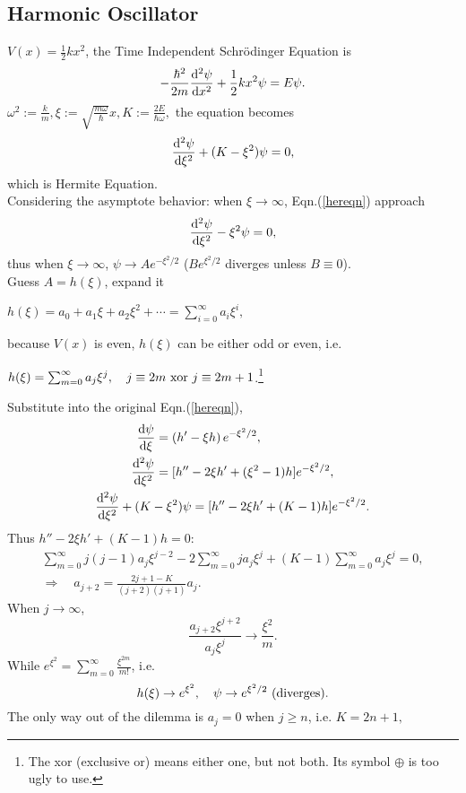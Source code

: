 \documentclass{article}
\def\d{{\rm d}}
\newcommand{\su}[1]{\vspace{-#1 pt}}%
\newcommand{\ds}[2]{\frac{\d #1}{\d #2}}%
\newcommand{\sds}[2]{\frac{\d^2 #1}{\d #2^2}}
\newcommand{\kh}[1]{\left(#1\right)}
\begin{document}
\subsection{Harmonic Oscillator}
$V(x)=\frac12kx^2$, the Time Independent Schrödinger Equation is
$$-\frac{\hbar^2}{2m}\sds\psi{x}+\frac12kx^2\psi=E\psi.$$
$\omega^2:=\frac km,\xi:=\sqrt{\frac{m\omega}\hbar}x,K:=\frac{2E}{\hbar\omega},$ the equation becomes
\begin{align}\label{hereqn}
	\sds\psi\xi+(K-\xi^2)\psi=0,
\end{align}
which is Hermite Equation.\\
Considering the asymptote behavior: when $\xi\to\infty$, Eqn.(\ref{hereqn}) approach
$$\sds\psi\xi-\xi^2\psi=0,$$
thus when $\xi\to\infty$, $\psi\to Ae^{-\xi^2/2}$ ($Be^{\xi^2/2}$ diverges unless $B\equiv 0$).\\
Guess $A=h(\xi)$, expand it
\begin{center}
	$h(\xi)=a_0+a_1\xi+a_2\xi^2+\cdots=\sum_{i=0}^\infty a_i\xi^i,$
\end{center}
because $V(x)$ is even, $h(\xi)$ can be either odd or even, i.e.
\begin{center}
	$h(\xi)=\sum_{m=0}^\infty a_j\xi^j,\quad j\equiv 2m~{\rm xor}~j\equiv 2m+1$.\footnote{The xor (exclusive or) means either one, but not both. Its symbol $\oplus$ is too ugly to use.}
\end{center}
Substitute into the original Eqn.(\ref{hereqn}),
\begin{gather*}
	\begin{aligned}
		\ds\psi\xi  & =\kh{h'-\xi h}e^{-\xi^2/2},            \\
		\sds\psi\xi & =[h''-2\xi h'+(\xi^2-1)h]e^{-\xi^2/2},
	\end{aligned}\\
	\sds\psi\xi+(K-\xi^2)\psi=[h''-2\xi h'+(K-1)h]e^{-\xi^2/2}.
\end{gather*}
Thus $h''-2\xi h'+(K-1)h=0$:
\begin{gather*}
	\sum_{m=0}^\infty j(j-1)a_j\xi^{j-2}-2\sum_{m=0}^\infty ja_j\xi^j+(K-1)\sum_{m=0}^\infty a_j\xi^j=0,\\
	\Rightarrow\quad a_{j+2}=\frac{2j+1-K}{(j+2)(j+1)}a_j.
\end{gather*}
When $j\to\infty$,
$$\frac{a_{j+2}\xi^{j+2}}{a_j\xi^j}\to\frac{\xi^2}m.$$
While $e^{\xi^2}=\sum_{m=0}^\infty\frac{\xi^{2m}}{m!}$, i.e.\su{10}
$$h(\xi)\to e^{\xi^2},\quad\psi\to e^{\xi^2/2}~{\rm(diverges)}.$$
The only way out of the dilemma is $a_j=0$ when $j\geqslant n$, i.e. $K=2n+1,$
\end{document}
